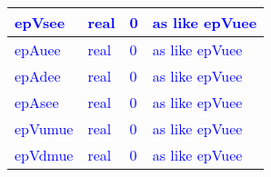 \documentclass{article}
\begin{document}
\begin{longtable}{llll}
\midrule
\textcolor{blue}{epVsee} & \begin{minipage}[t]{2cm}\textcolor{blue}{real}\end{minipage} & \begin{minipage}[t]{2cm}\textcolor{blue}{0}\end{minipage} & \begin{minipage}[t]{12cm}\textcolor{blue}{as like epVuee}\end{minipage}\\*
\midrule
\textcolor{blue}{epAuee} & \begin{minipage}[t]{2cm}\textcolor{blue}{real}\end{minipage} & \begin{minipage}[t]{2cm}\textcolor{blue}{0}\end{minipage} & \begin{minipage}[t]{12cm}\textcolor{blue}{as like epVuee}\end{minipage}\\*
\midrule
\textcolor{blue}{epAdee} & \begin{minipage}[t]{2cm}\textcolor{blue}{real}\end{minipage} & \begin{minipage}[t]{2cm}\textcolor{blue}{0}\end{minipage} & \begin{minipage}[t]{12cm}\textcolor{blue}{as like epVuee}\end{minipage}\\*
\midrule
\textcolor{blue}{epAsee} & \begin{minipage}[t]{2cm}\textcolor{blue}{real}\end{minipage} & \begin{minipage}[t]{2cm}\textcolor{blue}{0}\end{minipage} & \begin{minipage}[t]{12cm}\textcolor{blue}{as like epVuee}\end{minipage}\\*
\midrule
\textcolor{blue}{epVumue} & \begin{minipage}[t]{2cm}\textcolor{blue}{real}\end{minipage} & \begin{minipage}[t]{2cm}\textcolor{blue}{0}\end{minipage} & \begin{minipage}[t]{12cm}\textcolor{blue}{as like epVuee}\end{minipage}\\*
\midrule
\textcolor{blue}{epVdmue} & \begin{minipage}[t]{2cm}\textcolor{blue}{real}\end{minipage} & \begin{minipage}[t]{2cm}\textcolor{blue}{0}\end{minipage} & \begin{minipage}[t]{12cm}\textcolor{blue}{as like epVuee}\end{minipage}\\*

\end{longtable}
\end{document}
